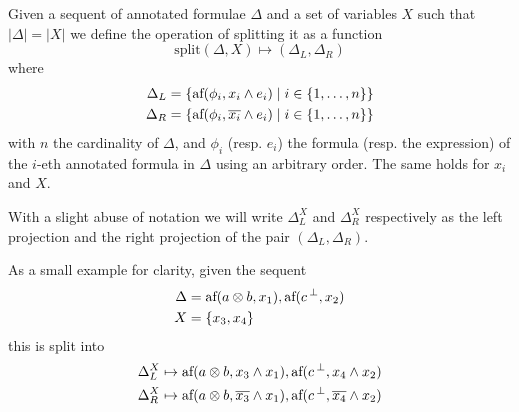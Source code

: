 \documentclass[a4paper, 12pt, english]{report}
\begin{document}
\begin{define}[Splitting]
	\label{def:split}
	Given a sequent of annotated formulae $\Delta$ and a set of variables $X$ such that $|\Delta| = |X|$ we define the operation of splitting it as a function
	$$ \text{split}(\Delta, X) \mapsto (\Delta_L, \Delta_R) $$
	where
	\begin{align*}
		\Delta_L &= \{ \text{af}(\phi_i, x_i \wedge e_i) \mid i \in \{1, \dots, n\}\} \\
		\Delta_R &= \{ \text{af}(\phi_i, \overline{x_i} \wedge e_i) \mid i \in \{1, \dots, n\}\}
	\end{align*}
	with $n$ the cardinality of $\Delta$, and $\phi_i$ (resp. $e_i$) the formula (resp. the expression) of the $i$-eth annotated formula in $\Delta$ using an arbitrary order.
	The same holds for $x_i$ and $X$.

	\noindent With a slight abuse of notation we will write $\Delta_L^X$ and $\Delta_R^X$ respectively as the left projection and the right projection of the pair $(\Delta_L, \Delta_R)$.
\end{define}
As a small example for clarity, given the sequent
\begin{align*}
	\Delta &= \text{af}(a \otimes b, x_1), \text{af}({c}\,^{\bot}, x_2) \\
	X      &= \{ x_3, x_4 \} 
\end{align*}
this is split into
\begin{align*}
	\Delta_L^X &\mapsto \text{af}(a \otimes b, x_3 \wedge x_1), \text{af}({c}\,^{\bot}, x_4 \wedge x_2) \\
	\Delta_R^X &\mapsto \text{af}(a \otimes b, \overline{x_3} \wedge x_1), \text{af}({c}\,^{\bot}, \overline{x_4} \wedge x_2) 
\end{align*}

\end{document}
